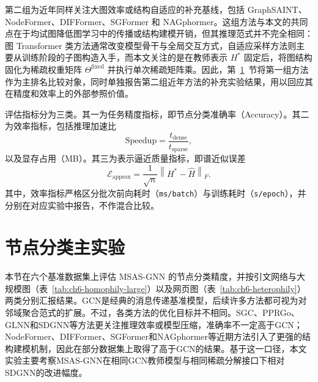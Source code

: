 第二组为近年同样关注大图效率或结构自适应的补充基线，包括 GraphSAINT\cite{Zeng2020GraphSAINT}、NodeFormer\cite{Wu2022NodeFormer}、DIFFormer\cite{Wu2023DIFFormer}、SGFormer\cite{Wu2023SGFormer} 和 NAGphormer\cite{Chen2023NAGphormer}。这组方法与本文的共同点在于均试图降低图学习中的传播或结构建模开销，但其推理范式并不完全相同：图 Transformer 类方法通常改变模型骨干与全局交互方式，自适应采样方法则主要从训练阶段的子图构造入手，而本文关注的是在教师表示 $H^*$ 固定后，将图结构固化为稀疏权重矩阵 $\Theta^{\mathrm{fixed}}$ 并执行单次稀疏矩阵乘。因此，第~\ref{sec:ch6-main}~节将第一组方法作为主排名比较对象，同时单独报告第二组近年方法的补充实验结果，用以回应其在精度和效率上的外部参照价值。

评估指标分为三类。其一为任务精度指标，即节点分类准确率（Accuracy）。其二为效率指标，包括推理加速比
\begin{equation}
\mathrm{Speedup}=\frac{t_{\mathrm{dense}}}{t_{\mathrm{sparse}}},
\label{eq:ch6-speedup}
\end{equation}
以及显存占用（MB）。其三为表示逼近质量指标，即谱近似误差
\begin{equation}
\mathcal{E}_{\mathrm{approx}}=\frac{1}{\sqrt{n}}\left\|H^*-\hat{H}\right\|_{F}.
\label{eq:ch6-approx}
\end{equation}
其中，效率指标严格区分批次前向耗时（\texttt{ms/batch}）与训练耗时（\texttt{s/epoch}），并分别在对应实验中报告，不作混合比较。

\section{节点分类主实验}
\label{sec:ch6-main}

本节在六个基准数据集上评估 MSAS-GNN 的节点分类精度，并按引文网络与大规模图（表~\ref{tab:ch6-homophily-large}）以及网页图（表~\ref{tab:ch6-heterophily}）两类分别汇报结果。GCN是经典的消息传递基准模型，后续许多方法都可视为对邻域聚合范式的扩展。不过，各类方法的优化目标并不相同。SGC、PPRGo、GLNN和SDGNN等方法更关注推理效率或模型压缩，准确率不一定高于GCN；NodeFormer、DIFFormer、SGFormer和NAGphormer等近期方法引入了更强的结构建模机制，因此在部分数据集上取得了高于GCN的结果。基于这一口径，本文实验主要考察MSAS-GNN在相同GCN教师模型与相同稀疏分解接口下相对SDGNN的改进幅度。

